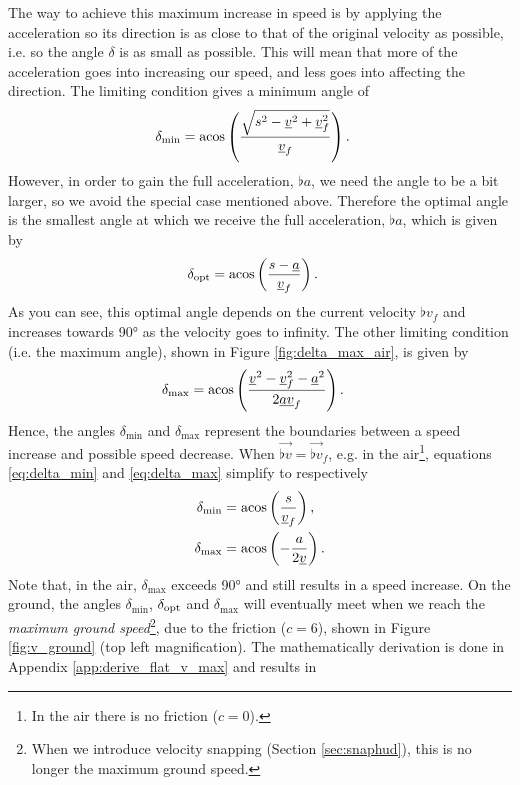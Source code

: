 The way to achieve this maximum increase in speed is by applying the acceleration so its direction is as close to that of the original velocity as possible, i.e. so the angle $\delta$ is as small as possible. This will mean that more of the acceleration goes into increasing our speed, and less goes into affecting the direction. The limiting condition gives a minimum angle of
\begin{align}
\label{eq:delta_min}
\delta_{\min} &= \acos\left(\frac{\sqrt{s^2 - \flat{v}^2 + \flat{v}_f^2}}{\flat{v}_f} \right).
\end{align}
However, in order to gain the full acceleration, $\flat{a}$, we need the angle to be a bit larger, so we avoid the special case mentioned above. Therefore the optimal angle is the smallest angle at which we receive the full acceleration, $\flat{a}$, which is given by
\begin{align}
\label{eq:delta_opt}
\delta_{\opt} &= \acos\left( \frac{s - \flat{a}}{\flat{v}_f} \right).
\end{align}
As you can see, this optimal angle depends on the current velocity $\flat{v}_f$ and increases towards \ang{90} as the velocity goes to infinity. The other limiting condition (i.e. the maximum angle), shown in Figure \ref{fig:delta_max_air}, is given by
\begin{align}
\label{eq:delta_max}
\delta_{\max} &= \acos\left( \frac{\flat{v}^2 - \flat{v}_f^2 - \flat{a}^2}{2 \flat{a} \flat{v}_f} \right).
\end{align}
Hence, the angles $\delta_{\min}$ and $\delta_{\max}$ represent the boundaries between a speed increase and possible speed decrease. When $\vec{\flat{v}} = \vec{\flat{v}}_f$, e.g. in the air\footnote{In the air there is no friction ($c = 0$).}, equations \eqref{eq:delta_min} and \eqref{eq:delta_max} simplify to respectively
\begin{align}
\label{eq:delta_min_vf}
\delta_{\min} &= \acos\left( \frac{s}{\flat{v}_f} \right),\\
\label{eq:delta_max_vf}
\delta_{\max} &= \acos\left( -\frac{a}{2 \flat{v}} \right).
\end{align}
Note that, in the air, $\delta_{\max}$ exceeds \ang{90} and still results in a speed increase. On the ground, the angles $\delta_{\min}$, $\delta_{\operatorname{opt}}$ and $\delta_{\max}$ will eventually meet when we reach the \emph{maximum ground speed}\footnote{When we introduce velocity snapping (Section \ref{sec:snaphud}), this is no longer the maximum ground speed.}, due to the friction ($c = 6$), shown in Figure \ref{fig:v_ground} (top left magnification). The mathematically derivation is done in Appendix \ref{app:derive_flat_v_max} and results in
